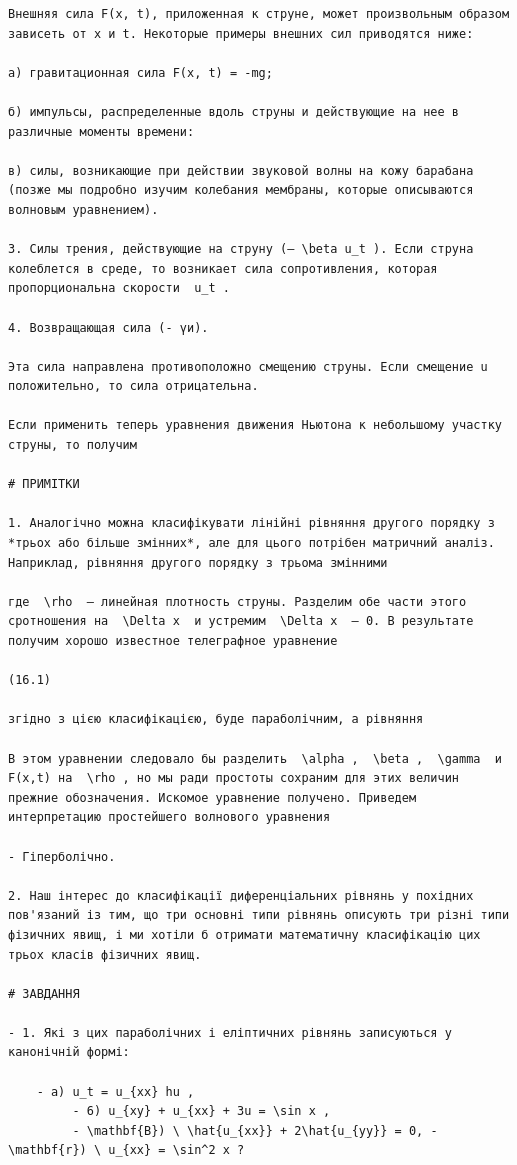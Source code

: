 \documentclass[
  ukrainian,
]{article}
\begin{document}
\begin{verbatim}
Внешняя сила F(x, t), приложенная к струне, может произвольным образом зависеть от x и t. Некоторые примеры внешних сил приводятся ниже:

а) гравитационная сила F(x, t) = -mg;

б) импульсы, распределенные вдоль струны и действующие на нее в различные моменты времени:

в) силы, возникающие при действии звуковой волны на кожу барабана (позже мы подробно изучим колебания мембраны, которые описываются волновым уравнением).

3. Силы трения, действующие на струну (— \beta u_t ). Если струна колеблется в среде, то возникает сила сопротивления, которая пропорциональна скорости  u_t .

4. Возвращающая сила (- үи).

Эта сила направлена противоположно смещению струны. Если смещение u положительно, то сила отрицательна.

Если применить теперь уравнения движения Ньютона к небольшому участку струны, то получим

# ПРИМІТКИ

1. Аналогічно можна класифікувати лінійні рівняння другого порядку з *трьох або більше змінних*, але для цього потрібен матричний аналіз. Наприклад, рівняння другого порядку з трьома змінними

где  \rho  — линейная плотность струны. Разделим обе части этого сротношения на  \Delta x  и устремим  \Delta x  — 0. В результате получим хорошо известное телеграфное уравнение

(16.1)

згідно з цією класифікацією, буде параболічним, а рівняння

В этом уравнении следовало бы разделить  \alpha ,  \beta ,  \gamma  и F(x,t) на  \rho , но мы ради простоты сохраним для этих величин прежние обозначения. Искомое уравнение получено. Приведем интерпретацию простейшего волнового уравнения

- Гіперболічно.

2. Наш інтерес до класифікації диференціальних рівнянь у похідних пов'язаний із тим, що три основні типи рівнянь описують три різні типи фізичних явищ, і ми хотіли б отримати математичну класифікацію цих трьох класів фізичних явищ.

# ЗАВДАННЯ

- 1. Які з цих параболічних і еліптичних рівнянь записуються у канонічній формі:

    - a) u_t = u_{xx} hu ,
         - 6) u_{xy} + u_{xx} + 3u = \sin x ,
         - \mathbf{B}) \ \hat{u_{xx}} + 2\hat{u_{yy}} = 0, - \mathbf{r}) \ u_{xx} = \sin^2 x ?


\end{verbatim}
\end{document}
